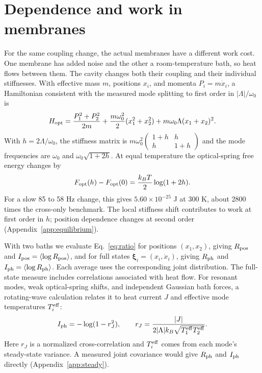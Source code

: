 \documentclass[10pt]{article}
\begin{document}
\section{Dependence and work in membranes}\label{sec:membranes}
For the same coupling change, the actual membranes have a different work cost. One membrane has added noise and the other a room-temperature bath, so heat flows between them.\cite{yang2020} The cavity changes both their coupling and their individual stiffnesses. With effective mass $m$, positions $x_i$, and momenta $P_i=m\dot x_i$, a Hamiltonian consistent with the measured mode splitting to first order in $|\Lambda|/\omega_0$ is
\begin{equation}
 H_{\rm opt}=\frac{P_1^2+P_2^2}{2m}
 +\frac{m\omega_0^2}{2}(x_1^2+x_2^2)
 +m\omega_0\Lambda(x_1+x_2)^2 . \label{eq:opt}
\end{equation}
With $h=2\Lambda/\omega_0$, the stiffness matrix is $m\omega_0^2\left(\begin{smallmatrix}1+h&h\\h&1+h\end{smallmatrix}\right)$ and the mode frequencies are $\omega_0$ and $\omega_0\sqrt{1+2h}$. At equal temperature the optical-spring free energy changes by
\begin{equation}
 F_{\rm opt}(h)-F_{\rm opt}(0)=\frac{k_BT}{2}\log(1+2h). \label{eq:optfree}
\end{equation}
For a slow 85 to 58 Hz change, this gives $5.60\times10^{-25}$ J at 300 K, about 2800 times the cross-only benchmark. The local stiffness shift contributes to work at first order in $h$; position dependence changes at second order (Appendix~\ref{app:equilibrium}).

With two baths we evaluate Eq.~\eqref{eq:ratio} for positions $(x_1,x_2)$, giving $R_{\rm pos}$ and $I_{\rm pos}=\langle\log R_{\rm pos}\rangle$, and for full states $\boldsymbol{\xi}_i=(x_i,\dot x_i)$, giving $R_{\rm ph}$ and $I_{\rm ph}=\langle\log R_{\rm ph}\rangle$. Each average uses the corresponding joint distribution. The full-state measure includes correlations associated with heat flow. For resonant modes, weak optical-spring shifts, and independent Gaussian bath forces, a rotating-wave calculation relates it to heat current $J$ and effective mode temperatures $T_i^{\rm eff}$:
\begin{equation}
 I_{\rm ph}=-\log(1-r_J^2),\qquad
 r_J=\frac{|J|}{2|\Lambda|k_B\sqrt{T_1^{\rm eff}T_2^{\rm eff}}}.
 \label{eq:current}
\end{equation}
Here $r_J$ is a normalized cross-correlation and $T_i^{\rm eff}$ comes from each mode's steady-state variance. A measured joint covariance would give $R_{\rm ph}$ and $I_{\rm ph}$ directly (Appendix~\ref{app:steady}).
\end{document}
